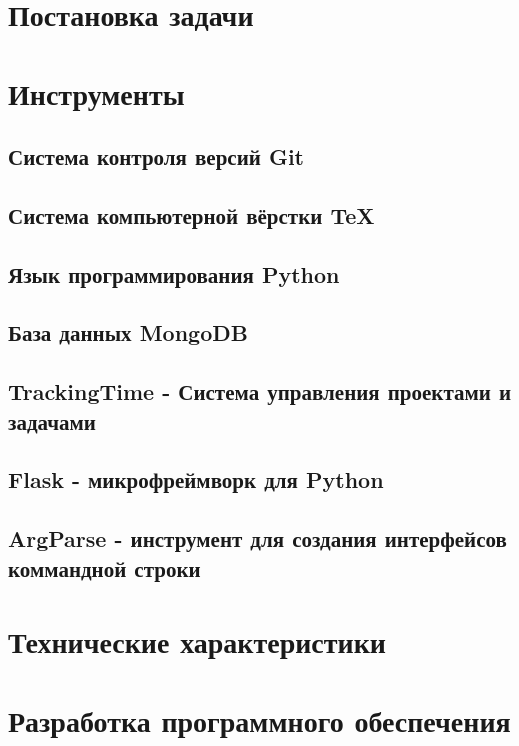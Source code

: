 \section{Постановка задачи}
\setcounter{figure}{0}

\section{Инструменты}
\setcounter{figure}{0}
\subsection{Система контроля версий Git}

\subsection{Система компьютерной вёрстки \TeX}

\subsection{Язык программирования Python}

\subsection{База данных MongoDB}

\subsection{TrackingTime - Система управления проектами и задачами}

\subsection{Flask - микрофреймворк для Python}

\subsection{ArgParse - инструмент для создания интерфейсов коммандной строки}


\newpage
\section{Технические характеристики}


\section{Разработка программного обеспечения}
\setcounter{figure}{0}
 
